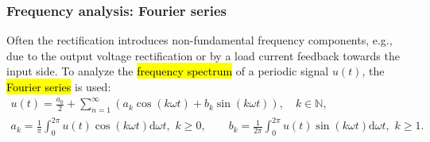 \begin{frame}
    \frametitle{Frequency analysis: Fourier series}
    Often the rectification introduces non-fundamental frequency components, e.g., due to the output voltage rectification or by a load current feedback towards the input side. To analyze the \hl{frequency spectrum} of a periodic signal $u(t)$, the \hl{Fourier series} is used:
    \begin{equation}
        \begin{gathered}
            u(t) = \frac{a_0}{2}+\sum_{n=1}^{\infty} \left( a_k \cos(k\omega t) + b_k \sin(k\omega t) \right), \quad k\in \mathbb{N},\\
            a_k= \frac{1}{\pi} \int_{0}^{2\pi} u(t) \cos(k\omega t) \mathrm{d}\omega t,\,\, k\geq 0, \qquad b_k = \frac{1}{2\pi} \int_{0}^{2\pi} u(t) \sin(k\omega t) \mathrm{d}\omega t,\,\, k \geq 1.
        \end{gathered}
    \end{equation}


\end{frame}
